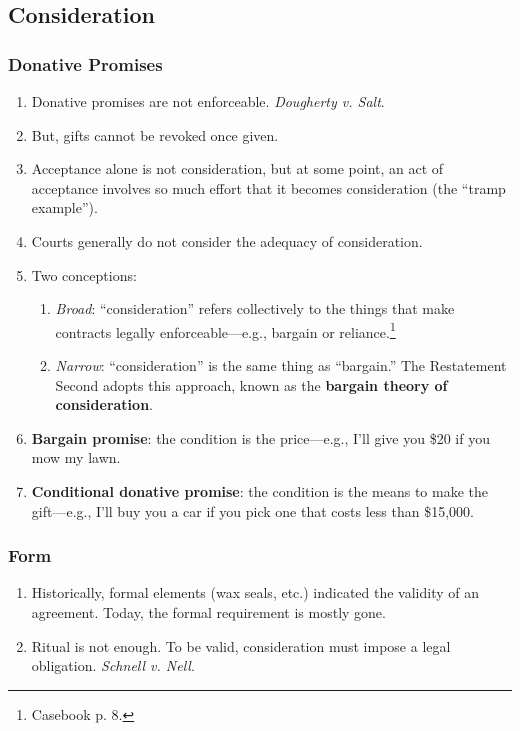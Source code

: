 \subsection{Consideration}

\subsubsection{Donative Promises}

\begin{enumerate}
    \item Donative promises are not enforceable. \emph{Dougherty v. Salt}.
    \item But, gifts cannot be revoked once given.
    \item Acceptance alone is not consideration, but at some point, an act of 
    acceptance involves so much effort that it becomes consideration (the 
    ``tramp example'').
    \item Courts generally do not consider the adequacy of consideration.
    \item Two conceptions:
    \begin{enumerate}
        \item \emph{Broad}: ``consideration'' refers collectively to the 
        things that make contracts legally enforceable---e.g., bargain or 
        reliance.\footnote{Casebook p. 8.}
        \item \emph{Narrow}: ``consideration'' is the same thing as 
        ``bargain.'' The Restatement Second adopts this approach, known as the 
        \textbf{bargain theory of consideration}.
    \end{enumerate}
    \item \textbf{Bargain promise}: the condition is the price---e.g., I'll 
    give you \$20 if you mow my lawn.
    \item \textbf{Conditional donative promise}: the condition is the means 
    to make the gift---e.g., I'll buy you a car if you pick one that costs 
    less than \$15,000.
\end{enumerate}

\subsubsection{Form}

\begin{enumerate}
    \item Historically, formal elements (wax seals, etc.) indicated the 
    validity of an agreement. Today, the formal requirement is mostly gone.
    \item Ritual is not enough. To be valid, consideration must impose a legal 
    obligation. \emph{Schnell v. Nell}.
\end{enumerate}

